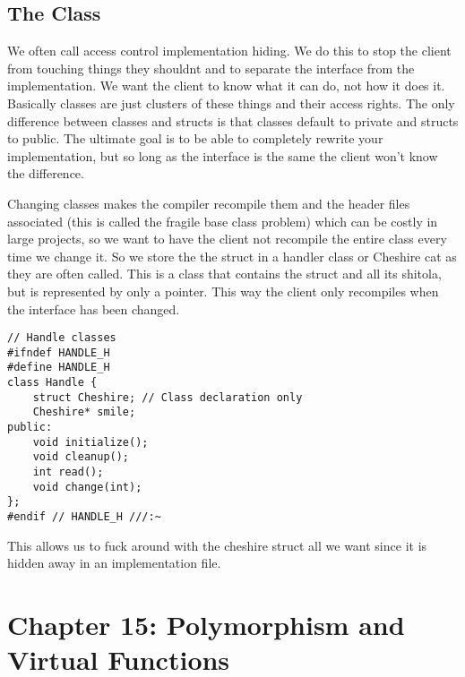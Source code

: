 \documentclass[12pt]{article}
\begin{document}
\subsection*{The Class}
We often call access control implementation hiding. We do this to stop the client from touching things they shouldnt and to separate the interface from the implementation. We want the client to know what it can do, not how it does it. Basically classes are just clusters of these things and their access rights. The only difference between classes and structs is that classes default to private and structs to public. The ultimate goal is to be able to completely rewrite your implementation, but so long as the interface is the same the client won't know the difference.

Changing classes makes the compiler recompile them and the header files associated (this is called the fragile base class problem) which can be costly in large projects, so we want to have the client not recompile the entire class every time we change it. So we store the the struct in a handler class or Cheshire cat as they are often called. This is a class that contains the struct and all its shitola, but is represented by only a pointer. This way the client only recompiles when the interface has been changed.
\begin{lstlisting}
// Handle classes
#ifndef HANDLE_H
#define HANDLE_H
class Handle {
    struct Cheshire; // Class declaration only
    Cheshire* smile;
public:
    void initialize();
    void cleanup();
    int read();
    void change(int);
};
#endif // HANDLE_H ///:~
\end{lstlisting}

This allows us to fuck around with the cheshire struct all we want since it is hidden away in an implementation file.

\section*{Chapter 15: Polymorphism and Virtual Functions}
\end{document}

